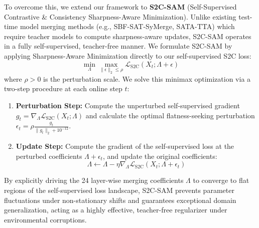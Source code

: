 \documentclass{article}
\theoremstyle{plain}
\theoremstyle{definition}
\theoremstyle{remark}
\begin{document}
To overcome this, we extend our framework to \textbf{S2C-SAM} (Self-Supervised Contrastive \& Consistency Sharpness-Aware Minimization). Unlike existing test-time model merging methods (e.g., SBF-SAT-SyMerge, SATA-TTA) which require teacher models to compute sharpness-aware updates, S2C-SAM operates in a fully self-supervised, teacher-free manner. We formulate S2C-SAM by applying Sharpness-Aware Minimization directly to our self-supervised S2C loss:
\begin{equation}
    \min_{\Lambda} \max_{\|\epsilon\|_2 \le \rho} \mathcal{L}_{\text{S2C}}(X_t; \Lambda + \epsilon)
\end{equation}
where $\rho > 0$ is the perturbation scale. We solve this minimax optimization via a two-step procedure at each online step $t$:
\begin{enumerate}
    \item \textbf{Perturbation Step:} Compute the unperturbed self-supervised gradient $g_t = \nabla_{\Lambda} \mathcal{L}_{\text{S2C}}(X_t; \Lambda)$ and calculate the optimal flatness-seeking perturbation $\epsilon_t = \rho \frac{g_t}{\|g_t\|_2 + 10^{-12}}$.
    \item \textbf{Update Step:} Compute the gradient of the self-supervised loss at the perturbed coefficients $\Lambda + \epsilon_t$, and update the original coefficients:
    \begin{equation}
        \Lambda \leftarrow \Lambda - \eta \nabla_{\Lambda} \mathcal{L}_{\text{S2C}}(X_t; \Lambda + \epsilon_t)
    \end{equation}
\end{enumerate}
By explicitly driving the 24 layer-wise merging coefficients $\Lambda$ to converge to flat regions of the self-supervised loss landscape, S2C-SAM prevents parameter fluctuations under non-stationary shifts and guarantees exceptional domain generalization, acting as a highly effective, teacher-free regularizer under environmental corruptions.
\end{document}

